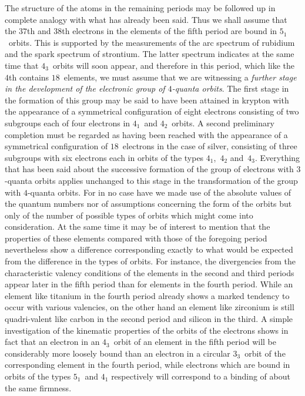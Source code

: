  The structure of the atoms
in the remaining periods may be followed up in complete analogy
with what has already been said. Thus we shall assume that the
$37$th and $38$th electrons in the elements of the fifth period are
bound in $5_{1}$~orbits. This is supported by the measurements of the
arc spectrum of rubidium and the spark spectrum of strontium.
The latter spectrum indicates at the same time that $4_{3}$~orbits will
soon appear, and therefore in this period, which like the $4$th
contains $18$~elements, we must assume that we are witnessing a
\emph{further stage in the development of the electronic group of $4$-quanta
orbits}. The first stage in the formation of this group may be said
to have been attained in krypton with the appearance of a symmetrical
configuration of eight electrons consisting of two subgroups
each of four electrons in $4_{1}$~and $4_{2}$~orbits. A second preliminary
completion must be regarded as having been reached with the
appearance of a symmetrical configuration of $18$~electrons in the
case of silver, consisting of three subgroups with six electrons each
in orbits of the types $4_{1}$,~$4_{2}$ and~$4_{3}$. Everything that has been said
about the successive formation of the group of electrons with $3$-quanta
orbits applies unchanged to this stage in the transformation
of the group with $4$-quanta orbits. For in no case have we made
use of the absolute values of the quantum numbers nor of assumptions
concerning the form of the orbits but only of the number of
possible types of orbits which might come into consideration. At
the same time it may be of interest to mention that the properties
of these elements compared with those of the foregoing period
nevertheless show a difference corresponding exactly to what would
be expected from the difference in the types of orbits. For instance,
the divergencies from the characteristic valency conditions of the
elements in the second and third periods appear later in the fifth
period than for elements in the fourth period. While an element
like titanium in the fourth period already shows a marked tendency
to occur with various valencies, on the other hand an element like
zirconium is still quadri-valent like carbon in the second period
and silicon in the third. A simple investigation of the kinematic
properties of the orbits of the electrons shows in fact that an
electron in an  $4_{3}$~orbit of an element in the fifth
period will be considerably more loosely bound than an electron in
a circular $3_{3}$~orbit of the corresponding element in the fourth
period, while electrons which are bound in  orbits of the
types $5_{1}$~and $4_{1}$ respectively will correspond to a binding of about
the same firmness.

